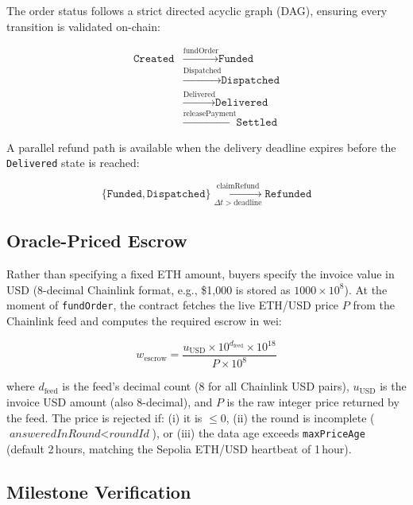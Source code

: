 \documentclass[conference]{IEEEtran}
\begin{document}
The order status follows a strict directed acyclic graph (DAG),
ensuring every transition is validated on-chain:

\begin{align}
  \texttt{Created} &\xrightarrow{\text{fundOrder}} \texttt{Funded} \nonumber\\
  &\xrightarrow{\text{Dispatched}} \texttt{Dispatched} \nonumber\\
  &\xrightarrow{\text{Delivered}} \texttt{Delivered} \nonumber\\
  &\xrightarrow{\text{releasePayment}} \texttt{Settled}
  \label{eq:fsm}
\end{align}

\noindent A parallel refund path is available when the delivery
deadline expires before the \texttt{Delivered} state is reached:

\begin{equation}
  \{\texttt{Funded}, \texttt{Dispatched}\}
  \xrightarrow[\Delta t > \text{deadline}]{\text{claimRefund}}
  \texttt{Refunded}
\end{equation}

\subsection{Oracle-Priced Escrow}

Rather than specifying a fixed ETH amount, buyers specify the invoice
value in USD (8-decimal Chainlink format, e.g., \$1{,}000 is stored as
$1000 \times 10^8$).
At the moment of \texttt{fundOrder}, the contract fetches the live
ETH/USD price $P$ from the Chainlink feed and computes the required
escrow in wei:

\begin{equation}
  w_{\text{escrow}} = \frac{u_{\text{USD}} \times 10^{d_{\text{feed}}} \times 10^{18}}
                           {P \times 10^8}
  \label{eq:usd_to_wei}
\end{equation}

\noindent where $d_{\text{feed}}$ is the feed's decimal count (8 for
all Chainlink USD pairs), $u_{\text{USD}}$ is the invoice USD amount
(also 8-decimal), and $P$ is the raw integer price returned by the
feed.
The price is rejected if: (i) it is $\le 0$, (ii) the round is
incomplete ($\textit{answeredInRound} < \textit{roundId}$), or (iii)
the data age exceeds \texttt{maxPriceAge} (default 2\,hours,
matching the Sepolia ETH/USD heartbeat of 1\,hour).

\subsection{Milestone Verification}
\end{document}

